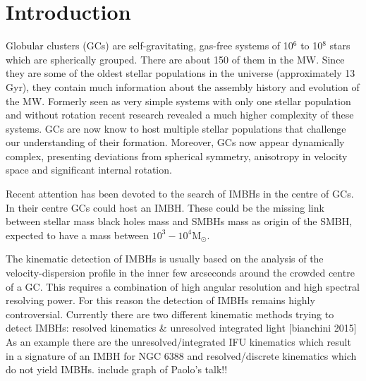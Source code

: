 

\section{Introduction}\label{Introduction}
Globular clusters (\acsp{GC}) are self-gravitating, gas-free systems of 10\(^6\) to 10\(^8\) stars which are spherically grouped. There are about 150 of them in the \ac{MW}. Since they are some of the oldest stellar populations in the universe (approximately 13 Gyr), they contain much information about the assembly history and evolution of the \ac{MW}. Formerly seen as very simple systems with only one stellar population and without rotation recent research revealed a much higher complexity of these systems. \acp{GC} are now know to host multiple stellar populations that challenge our understanding of their formation. Moreover, \acp{GC} now appear dynamically complex, presenting deviations from spherical symmetry, anisotropy in velocity space and significant internal rotation.
 
\par Recent attention has been devoted to the search of \acp{IMBH} in the centre of \acp{GC}. In their centre \acp{GC} could host an \ac{IMBH}. These could be the missing link between stellar mass black holes \color{red} mass \color{black} and \acp{SMBH} \color{red} mass \color{black} as origin of the \ac{SMBH}, expected to have a mass between \(10^3-10^4 \mathrm{M}_\odot\). \par The kinematic detection of \acp{IMBH} is usually based on the analysis of the velocity-dispersion profile in the inner few arcseconds around the crowded centre of a \ac{GC}. This requires a combination of high angular resolution and high spectral resolving power. For this reason the detection of \acp{IMBH} remains highly controversial. Currently there are two different kinematic methods trying to detect \acp{IMBH}: \color{red} resolved kinematics \& unresolved integrated light [bianchini 2015] \color{black} As an example there are the unresolved/integrated IFU kinematics which result in a signature of an \ac{IMBH} for NGC 6388 and resolved/discrete kinematics which do not yield \acp{IMBH}. \color{red} include graph of Paolo's talk!! \color{black} 
\\

